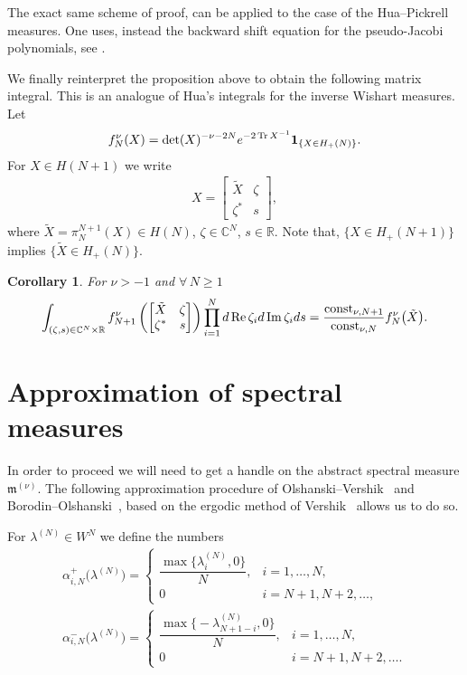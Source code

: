 \documentclass[11pt]{article}
\numberwithin{equation}{section}
\newtheorem{Corollary}[Theorem]{Corollary}
\begin{document}
\begin{Remark}The exact same scheme of proof, can be applied to the case of the Hua--Pickrell measures. One uses, instead the backward shift equation for the pseudo-Jacobi polynomials, see \cite[Section~9.9]{HypergeometricOrthogonalPolynomials}.
\end{Remark}

We finally reinterpret the proposition above to obtain the following matrix integral. This is an analogue of Hua's integrals \cite{Hua,Neretin} for the inverse Wishart measures. Let
\begin{gather*}
f_{N}^{\nu}(X)=\det(X)^{-\nu-2N} {\rm e}^{-2\operatorname{Tr}X^{-1}}\mathbf{1}_{\{X \in H_+(N)\}}.
\end{gather*}
For $X\in H(N+1)$ we write
\begin{gather*}
X=\begin{bmatrix}
\tilde{X} & \zeta \\
\zeta^* & s
\end{bmatrix},
\end{gather*}
where $\tilde{X}=\pi_N^{N+1}(X) \in H(N)$, $\zeta \in \mathbb{C}^{N}$, $s \in \mathbb{R}$. Note that, $\{X \in H_+(N+1)\}$ implies $\{\tilde{X} \in H_+(N)\}$.
\begin{Corollary}
For $\nu>-1$ and $\forall\, N \ge 1$
\begin{gather*}
\int_{(\zeta,s)\in \mathbb{C}^N\times \mathbb{R}}^{}f_{N+1}^{\nu}\left(\begin{bmatrix}
\tilde{X} & \zeta \\
\zeta^* & s
\end{bmatrix}\right)\prod_{i=1}^{N}{\rm d} \operatorname{Re} \zeta_i {\rm d}\operatorname{Im} \zeta_i {\rm d}s=\frac{\operatorname{const}_{\nu, N+1}}{\operatorname{const}_{\nu, N}}f_{N}^{\nu}\big(\tilde{X}\big).
\end{gather*}
\end{Corollary}

\section{Approximation of spectral measures}\label{section3}
In order to proceed we will need to get a handle on the abstract spectral measure $\mathfrak{m}^{(\nu)}$. The following approximation procedure of Olshanski--Vershik~\cite{OlshanskiVershik} and Borodin--Olshanski~\cite{BorodinOlshanskiErgodic}, based on the ergodic method of Vershik~\cite{VershikErgodic} allows us to do so.

For $\lambda^{(N)} \in W^N$ we define the numbers
\begin{gather*}
\alpha_{i,N}^+\big(\lambda^{(N)}\big) =\begin{cases}
\dfrac{\max\big\{\lambda^{(N)}_{i},0\big\}}{N},& i=1,\dots, N,\\
0 & i=N+1,N+2,\dots,
\end{cases} \\
\alpha_{i,N}^-\big(\lambda^{(N)}\big) =\begin{cases}
\dfrac{\max\big\{{-}\lambda^{(N)}_{N+1-i},0\big\}}{N}, & i=1,\dots, N,\\
0 & i=N+1,N+2,\dots.
\end{cases}
\end{gather*}
\end{document}
